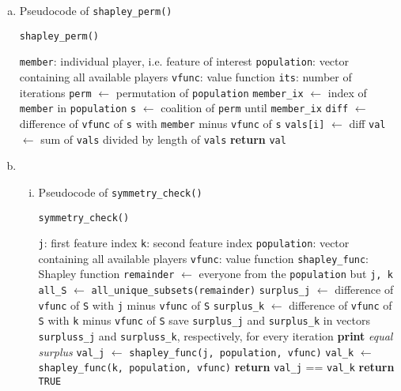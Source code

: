 {\begin{enumerate}[a)]
	\item Pseudocode of \texttt{shapley\_perm()}
	
	\begin{algorithm}[H]
		\caption{\texttt{shapley\_perm()}}
		\begin{algorithmic}[1]
			\Require \texttt{member}: individual player, i.e. feature of interest
			\Require \texttt{population}: vector containing all available players
			\Require \texttt{vfunc}: value function
			\Require \texttt{its}: number of iterations
			\State \texttt{perm} $\gets$ permutation of \texttt{population}
			\State \texttt{member\_ix} $\gets$ index of \texttt{member} in \texttt{population}
			\State \texttt{s} $\gets$ coalition of \texttt{perm} until \texttt{member\_ix}
			\State \texttt{diff} $\gets$ difference of \texttt{vfunc} of \texttt{s} with \texttt{member} minus \texttt{vfunc} of \texttt{s}
			\State \texttt{vals[i]} $\gets$ diff
			\EndFor
			\State \texttt{val} $\gets$ sum of \texttt{vals} divided by length of \texttt{vals}
			\State \textbf{return} \texttt{val}
		\end{algorithmic}
	\end{algorithm}
	
	\item 
	\begin{enumerate}[(i)]
	\item Pseudocode of \texttt{symmetry\_check()}
	
	\begin{algorithm}[H]
		\caption{\texttt{symmetry\_check()}}
		\begin{algorithmic}[1]
			\Require \texttt{j}: first feature index
			\Require \texttt{k}: second feature index
			\Require \texttt{population}: vector containing all available players
			\Require \texttt{vfunc}: value function
			\Require \texttt{shapley\_func}: Shapley function
			\State \texttt{remainder} $\gets$ everyone from the \texttt{population} but \texttt{j, k}
			\State \texttt{all\_S} $\gets$ \texttt{all\_unique\_subsets(remainder)}
			\State \texttt{surplus\_j} $\gets$ difference of \texttt{vfunc} of \texttt{S} with \texttt{j} minus \texttt{vfunc} of \texttt{S}
			\State \texttt{surplus\_k} $\gets$ difference of \texttt{vfunc} of \texttt{S} with \texttt{k} minus \texttt{vfunc} of \texttt{S}
			\State save \texttt{surplus\_j} and \texttt{surplus\_k} in vectors \texttt{surpluss\_j} and \texttt{surpluss\_k}, respectively, for every iteration
			\EndFor
			\State \textbf{print} \textit{equal surplus}
			\State \texttt{val\_j} $\gets$ \texttt{shapley\_func(j, population, vfunc)}
			\State \texttt{val\_k} $\gets$ \texttt{shapley\_func(k, population, vfunc)}
			\State \textbf{return} \texttt{val\_j} == \texttt{val\_k}
			\EndIf
			\State \textbf{return} \texttt{TRUE}
		\end{algorithmic}
	\end{algorithm}
	

\end{enumerate}
\end{enumerate}}
